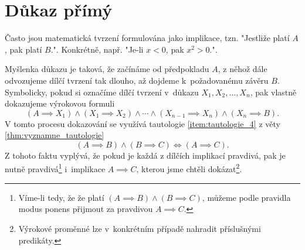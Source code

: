 \section{Důkaz přímý}\label{sec:dukaz_primy}
Často jsou matematická tvrzení formulována jako implikace, tzn. "Jestliže platí $A$, pak platí $B$.". Konkrétně, např. "Je-li $x<0$, pak $x^2>0$.".\par
Myšlenka důkazu je taková, že začínáme od předpokladu $A$, z něhož dále odvozujeme dílčí tvrzení tak dlouho, až dojdeme k~požadovanému závěru $B$. Symbolicky, pokud si označíme dílčí tvrzení v~důkazu $X_1, X_2, \dots, X_n$, pak vlastně dokazujeme výrokovou formuli
\begin{equation}\label{eq:primy_dukaz_formule}
    (A \implies X_1) \land (X_1 \implies X_2) \land \cdots \land (X_{n-1}\implies X_n) \land (X_n \implies B).
\end{equation}
V tomto procesu dokazování se využívá tautologie \ref{item:tautologie_4} z věty \ref{thm:vyznamne_tautologie}
\begin{equation*}
    (A \implies B) \land (B \implies C) \iff (A \implies C).
\end{equation*}
Z tohoto faktu vyplývá, že pokud je každá z dílčích implikací pravdivá, pak je nutně pravdivá\footnote{Víme-li tedy, že že platí $(A \implies B) \land (B \implies C)$, můžeme podle pravidla modus ponens přijmout za pravdivou $A\implies C$.} i~implikace $A \implies C$, kterou jsme chtěli dokázat\footnote{Výrokové proměnné lze v~konkrétním případě nahradit příslušnými predikáty.}.

